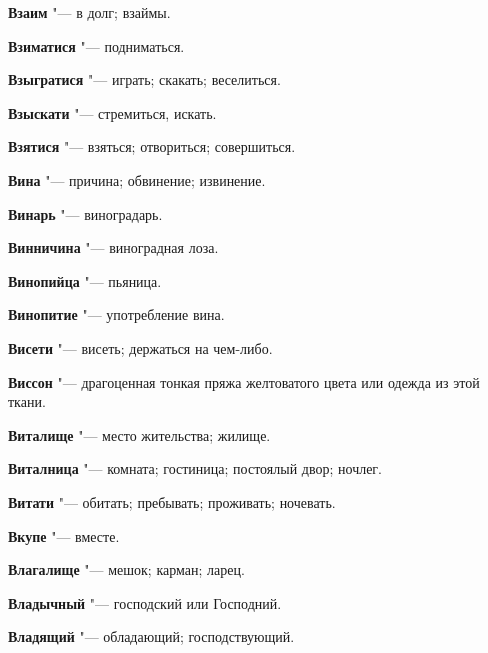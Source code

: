 \begin{mymulticols}{2}
\noindent\textbf{Взаим} "--- в долг; взаймы. 




\noindent\textbf{Взиматися} "--- подниматься. 




\noindent\textbf{Взыгратися} "--- играть; скакать; веселиться. 




\noindent\textbf{Взыскати} "--- стремиться, искать. 




\noindent\textbf{Взятися} "--- взяться; отвориться; совершиться. 




\noindent\textbf{Вина} "--- причина; обвинение; извинение. 




\noindent\textbf{Винарь} "--- виноградарь. 




\noindent\textbf{Винничина} "--- виноградная лоза. 




\noindent\textbf{Винопийца} "--- пьяница. 




\noindent\textbf{Винопитие} "--- употребление вина. 




\noindent\textbf{Висети} "--- висеть; держаться на чем-либо. 




\noindent\textbf{Виссон} "--- драгоценная тонкая пряжа желтоватого цвета или одежда из этой ткани. 




\noindent\textbf{Виталище} "--- место жительства; жилище. 




\noindent\textbf{Виталница} "--- комната; гостиница; постоялый двор; ночлег. 




\noindent\textbf{Витати} "--- обитать; пребывать; проживать; ночевать. 




\noindent\textbf{Вкупе} "--- вместе. 




\noindent\textbf{Влагалище} "--- мешок; карман; ларец. 




\noindent\textbf{Владычный} "--- господский или Господний. 




\noindent\textbf{Владящий} "--- обладающий; господствующий. 





\end{mymulticols}
